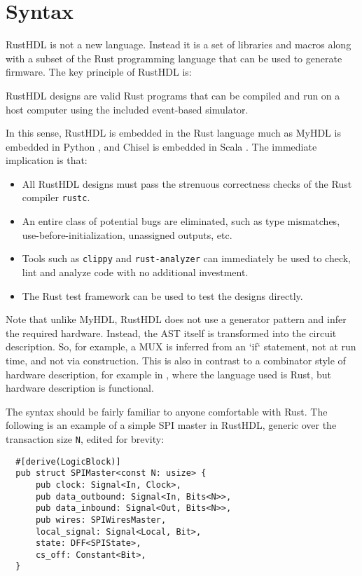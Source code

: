 \documentclass[sigplan,screen,sigconf]{acmart}
\begin{document}
\section{Syntax}
RustHDL is not a new language.  Instead it is a set of libraries and macros along with a 
subset of the Rust programming language that can be used to generate firmware.  The key
principle of RustHDL is:

\begin{tcolorbox}
RustHDL designs are valid Rust programs that can be compiled and run on a host computer
using the included event-based simulator.
\end{tcolorbox}

In this sense, RustHDL is embedded in the Rust language much as MyHDL is embedded in Python \cite{b3},
and Chisel is embedded in Scala \cite{b2}.  The immediate implication is that:
\begin{itemize}
  \item All RustHDL designs must pass the strenuous correctness checks of the Rust compiler \verb|rustc|.
  \item An entire class of potential bugs are eliminated, such as type mismatches, use-before-initialization,
  unassigned outputs, etc.
  \item Tools such as \verb|clippy| and \verb|rust-analyzer| can immediately be used to
  check, lint and analyze code with no additional investment.
  \item The Rust test framework can be used to test the designs directly.
\end{itemize}
Note that unlike MyHDL, RustHDL does not use a generator pattern and infer the required hardware.  Instead,
the AST itself is transformed into the circuit description.  So, for example, a MUX is inferred from an `if` statement,
not at run time, and not via construction.  This is also in contrast to a combinator style of hardware description, for example in \cite{b4b},
where the language used is Rust, but hardware description is functional.

The syntax should be fairly familiar to anyone comfortable with Rust.  The following is an example
of a simple SPI master in RustHDL, generic over the transaction size \verb|N|, edited for brevity:

\begin{verbatim}
  #[derive(LogicBlock)]
  pub struct SPIMaster<const N: usize> {
      pub clock: Signal<In, Clock>,
      pub data_outbound: Signal<In, Bits<N>>,
      pub data_inbound: Signal<Out, Bits<N>>,
      pub wires: SPIWiresMaster,
      local_signal: Signal<Local, Bit>,
      state: DFF<SPIState>, 
      cs_off: Constant<Bit>,
  }
\end{verbatim}  
\end{document}
